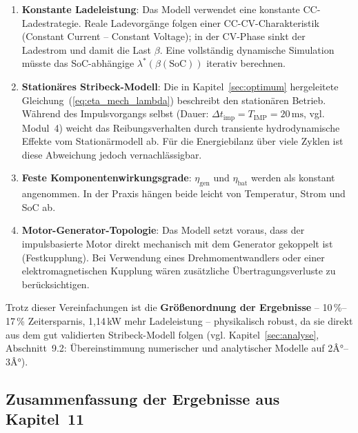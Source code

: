 ﻿\documentclass[a4paper,12pt]{article}
\begin{document}
\begin{enumerate}
  \item \textbf{Konstante Ladeleistung}: Das Modell verwendet eine
    konstante CC-Ladestrategie. Reale Ladevorgänge folgen einer
    CC-CV-Charakteristik (Constant Current -- Constant Voltage);
    in der CV-Phase sinkt der Ladestrom und damit die Last $\beta$.
    Eine vollständig dynamische Simulation müsste das SoC-abhängige
    $\lambda^*(\beta(\text{SoC}))$ iterativ berechnen.

  \item \textbf{Stationäres Stribeck-Modell}: Die in Kapitel~\ref{sec:optimum}
    hergeleitete Gleichung~(\ref{eq:eta_mech_lambda}) beschreibt den
    stationären Betrieb. Während des Impulsvorgangs selbst (Dauer:
    $\Delta t_\text{imp} = T_\text{IMP} = 20\,\text{ms}$, vgl. Modul~4)
    weicht das Reibungsverhalten durch transiente hydrodynamische Effekte
    vom Stationärmodell ab. Für die Energiebilanz über viele Zyklen
    ist diese Abweichung jedoch vernachlässigbar.

  \item \textbf{Feste Komponentenwirkungsgrade}: $\eta_\text{gen}$
    und $\eta_\text{bat}$ werden als konstant angenommen. In der Praxis
    hängen beide leicht von Temperatur, Strom und SoC ab.

  \item \textbf{Motor-Generator-Topologie}: Das Modell setzt voraus,
    dass der impulsbasierte Motor direkt mechanisch mit dem Generator
    gekoppelt ist (Festkupplung). Bei Verwendung eines Drehmomentwandlers
    oder einer elektromagnetischen Kupplung wären zusätzliche
    Übertragungsverluste zu berücksichtigen.
\end{enumerate}

Trotz dieser Vereinfachungen ist die \textbf{Größenordnung der Ergebnisse}
-- 10\,\%--17\,\% Zeitersparnis, 1{,}14\,kW mehr Ladeleistung --
physikalisch robust, da sie direkt aus dem gut validierten Stribeck-Modell
folgen (vgl. Kapitel~\ref{sec:analyse}, Abschnitt~9.2: Übereinstimmung
numerischer und analytischer Modelle auf 2Â°--3Â°).

\subsection{Zusammenfassung der Ergebnisse aus Kapitel~11}
\end{document}
